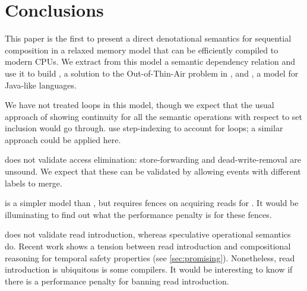 \section{Conclusions} %

This paper is the first to present a direct denotational semantics for
sequential composition in a relaxed memory model that can be
efficiently compiled to modern CPUs. We extract from this model a semantic
dependency relation and use it to build \PwTc, a solution to the
Out-of-Thin-Air problem in \cXI, and \PwTmca{}, a model for Java-like
languages.

We have not treated loops in this model, though we expect that the usual
approach of showing continuity for all the semantic operations with respect
to set inclusion would go through. \citet{DBLP:conf/esop/PaviottiCPWOB20} use
step-indexing to account for loops; a similar approach could be applied here.

\PwTmca{} does not validate access elimination: store-forwarding and
dead-write-removal are unsound.  We expect that these can be validated by
allowing events with different labels to merge. %

 is a simpler model than , but requires fences on
acquiring reads for \armeight{}.  It would be illuminating to find out what
the performance penalty is for these fences.

\PwT{} does not validate read introduction, whereas speculative operational
semantics do.  Recent work shows a tension between read introduction and
compositional reasoning for temporal safety properties (see
\textsection\ref{sec:promising}).  Nonetheless, read introduction is
ubiquitous is some compilers.  It would be interesting to know if there is a
performance penalty for banning read introduction.





